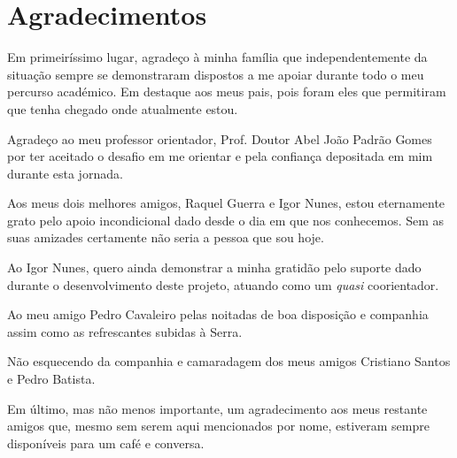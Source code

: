 \chapter*{Agradecimentos}
\label{ch::ack}

Em primeiríssimo lugar, agradeço à minha família que independentemente da situação sempre se demonstraram dispostos a me apoiar durante todo o meu percurso académico. Em destaque aos meus pais, pois foram eles que permitiram que tenha chegado onde atualmente estou.

Agradeço ao meu professor orientador, Prof. Doutor Abel João Padrão Gomes por ter aceitado o desafio em me orientar e pela confiança depositada em mim durante esta jornada.

Aos meus dois melhores amigos, Raquel Guerra e Igor Nunes, estou eternamente grato pelo apoio incondicional dado desde o dia em que nos conhecemos. Sem as suas amizades certamente não seria a pessoa que sou hoje.

Ao Igor Nunes, quero ainda demonstrar a minha gratidão pelo suporte dado durante o desenvolvimento deste projeto, atuando como um \textit{quasi} coorientador.

Ao meu amigo Pedro Cavaleiro pelas noitadas de boa disposição e companhia assim como as refrescantes subidas à Serra.

Não esquecendo da companhia e camaradagem dos meus amigos Cristiano Santos e Pedro Batista.

Em último, mas não menos importante, um agradecimento aos meus restante amigos que, mesmo sem serem aqui mencionados por nome, estiveram sempre disponíveis para um café e conversa.